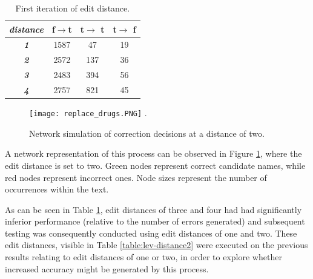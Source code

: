 \begin{table} [ht]
\renewcommand{\arraystretch}{1.6}
\setlength{\tabcolsep}{0.7em}
\caption{First iteration of edit distance.}
\label{table:lev-distance1}
\centering
\begin{tabular}{@{}c|c|c|c@{}}
\toprule
\textit{distance}   & \textbf{f$\rightarrow$t} & \textbf{t$\rightarrow$ t} & \textbf{t$\rightarrow$ f} \\ \midrule
\textit{\textbf{1}} & 1587                     & 47                        & 19                        \\ \midrule
\textit{\textbf{2}} & 2572                     & 137                       & 36                        \\ \midrule
\textit{\textbf{3}} & 2483                     & 394                       & 56                        \\ \midrule
\textit{\textbf{4}} & 2757                     & 821                       & 45                        \\ \bottomrule
\end{tabular}
\end{table}

\begin{figure}[ht]
\centering
\texttt{[image: replace\_drugs.PNG]}
\DeclareGraphicsExtensions.
\caption{Network simulation of correction decisions at a distance of two.}
\label{network}
\end{figure}

A network representation of this process can be observed in Figure \ref{network}, where the edit distance is set to two. Green nodes represent correct candidate names, while red nodes represent incorrect ones. Node sizes represent the number of occurrences within the text.

As can be seen in Table \ref{table:lev-distance1}, edit distances of three and four had had significantly inferior performance (relative to the number of errors generated) and subsequent testing was consequently conducted using edit distances of one and two. These edit distances, visible in Table \ref{table:lev-distance2}  were executed on the previous results relating to edit distances of one or two, in order to explore whether increased accuracy might be generated by this process.






